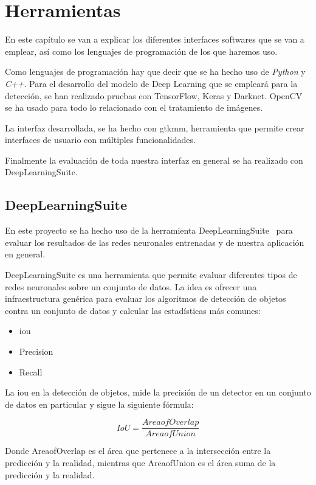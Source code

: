 \chapter{Herramientas}\label{cap.herramientas}
En este capítulo se van a explicar los diferentes interfaces softwares que se van a emplear, así como los lenguajes de programación de los que haremos uso.

Como lenguajes de programación hay que decir que se ha hecho uso de \textit{Python} y \textit{C++}. Para el desarrollo del modelo de Deep Learning que se empleará para la detección, se han realizado pruebas con TensorFlow, Keras y Darknet. OpenCV se ha usado para todo lo relacionado con el tratamiento de imágenes.

La interfaz desarrollada, se ha hecho con gtkmm, herramienta que permite crear interfaces de usuario con múltiples funcionalidades.

Finalmente la evaluación de toda nuestra interfaz en general se ha realizado con DeepLearningSuite.



\section{DeepLearningSuite}
En este proyecto se ha hecho uso de la herramienta DeepLearningSuite~\cite{detectionsuite} para evaluar los resultados de las redes neuronales entrenadas y de nuestra aplicación en general.

DeepLearningSuite es una herramienta que permite evaluar diferentes tipos de redes neuronales sobre un conjunto de datos. La idea es ofrecer una infraestructura genérica para evaluar los algoritmos de detección de objetos contra un conjunto de datos y calcular las estadísticas más comunes:
\begin{itemize}
    \item \acrfull{iou}
    \item Precision
    \item Recall
\end{itemize}

La \acrfull{iou} en la detección de objetos, mide la precisión de un detector en un conjunto de datos en particular y sigue la siguiente fórmula:

\begin{equation}\label{iou}
IoU = \frac{AreaofOverlap}{AreaofUnion}
\end{equation}

Donde AreaofOverlap es el área que pertenece a la intersección entre la predicción y la realidad, mientras que AreaofUnion es el área suma de la predicción y la realidad.

